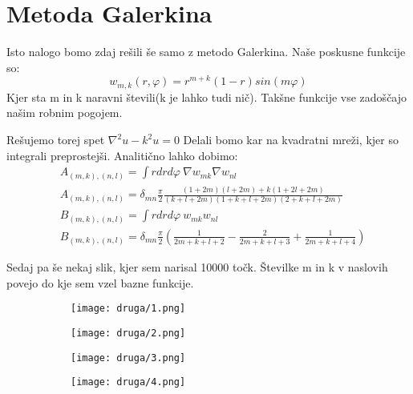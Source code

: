 \documentclass{article}
\begin{document}
\section{Metoda Galerkina}

Isto nalogo bomo zdaj rešili še samo z metodo Galerkina.
Naše poskusne funkcije so:
\begin{equation*}
w_{m,k} (r, \varphi) = r^{m+k}(1-r)sin(m \varphi)
\end{equation*}
Kjer sta m in k naravni števili(k je lahko tudi nič). Takšne funkcije vse zadoščajo našim robnim pogojem.

Rešujemo torej spet $\nabla^2 u - k^2 u = 0$
Delali bomo kar na kvadratni mreži, kjer so integrali preprostejši.
Analitično lahko dobimo:
\begin{align*}
&A_{(m,k),(n,l)} = \int r dr d\varphi \  \nabla w_{mk} \nabla w_{nl} \\
&A_{(m,k),(n,l)} = \delta_{mn} \frac{\pi}{2} \frac{(1+2m)(l+2m) + k(1+2l+2m)}{(k+l+2m)(1+k+l+2m)(2+k+l+2m)}\\
&B_{(m,k),(n,l)} = \int r dr d\varphi  \ w_{mk} w_{nl} \\
&B_{(m,k),(n,l)} = \delta_{mn}\frac{\pi}{2} \left(\frac{1}{2m+k+l+2} - \frac{2}{2m+k+l+3} + \frac{1}{2m+k+l+4} \right)
\end{align*}

Sedaj pa še nekaj slik, kjer sem narisal 10000 točk. Številke m in k v naslovih povejo do kje sem vzel bazne funkcije.

\begin{figure}[H]
\centering
\begin{subfigure}{.49\textwidth}
\texttt{[image: druga/1.png]}
\end{subfigure}
\begin{subfigure}{.49\textwidth}
\texttt{[image: druga/2.png]}
\end{subfigure}
\caption*{}
\end{figure}

\begin{figure}[H]
\centering
\begin{subfigure}{.49\textwidth}
\texttt{[image: druga/3.png]}
\end{subfigure}
\begin{subfigure}{.49\textwidth}
\texttt{[image: druga/4.png]}
\end{subfigure}
\caption*{}
\end{figure}
\end{document}
